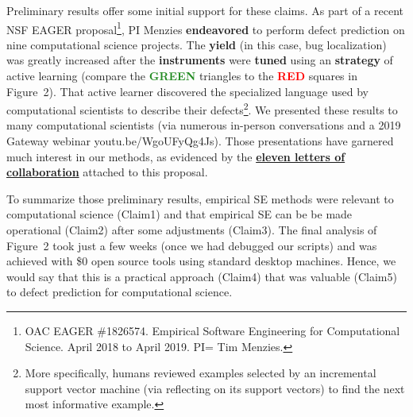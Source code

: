 \documentclass{NSF}
\begin{document}
\begin{nsfdescription}
Preliminary results offer some  initial support
for these claims. As part of a recent  NSF EAGER proposal\footnote{OAC EAGER \#1826574.  Empirical Software Engineering for Computational Science. April 2018 to April 2019. PI= Tim Menzies.}, PI Menzies {\bf endeavored}
 to perform defect prediction on nine computational science projects.
The {\bf yield} (in this case, bug localization)
was greatly increased after the {\bf instruments}  were {\bf  tuned}
using an {\bf strategy} of active learning
(compare the \textcolor{ForestGreen}{\bf GREEN} triangles  to
the \textcolor{red}{\bf RED} squares  in Figure~2).
That active learner discovered the specialized language
used by computational scientists to describe their defects\footnote{
More specifically, humans reviewed
examples selected by
an incremental support vector machine (via  reflecting on its support vectors)
to find the next most informative example.}.
We  presented these results to many computational scientists (via 
numerous
in-person conversations
and a 2019 Gateway webinar youtu.be/WgoUFyQg4Js). Those presentations have garnered much interest in our methods,
as evidenced by the \underline{{\bf eleven  letters of collaboration}}
attached to this proposal. 



To summarize those preliminary results,
    empirical SE methods  were relevant to
computational science (Claim1) and that empirical SE can be 
be made operational (Claim2) after some adjustments (Claim3).
The final analysis of Figure~2 took just a few weeks (once we had debugged our scripts)
and was achieved with \$0 open source tools using standard desktop machines. Hence, we would
say that this is a practical approach (Claim4) that was  valuable (Claim5)
to defect prediction for computational science.




\end{nsfdescription}
\end{document}
